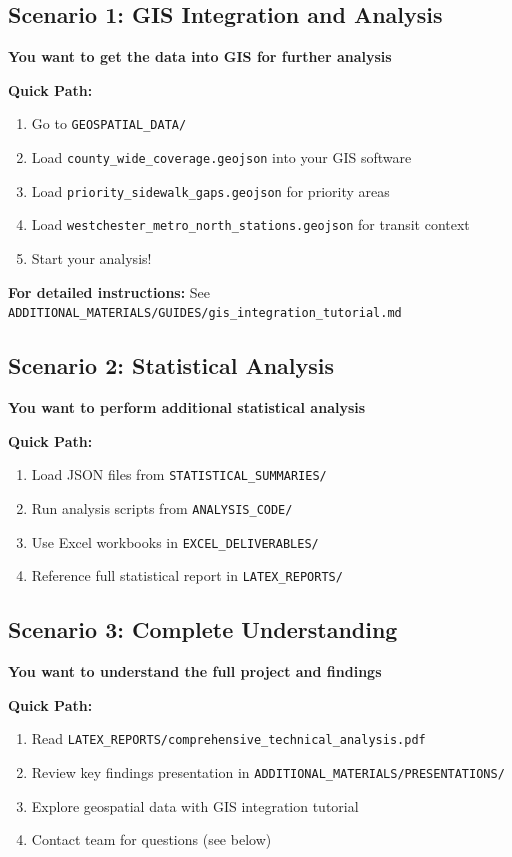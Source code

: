 \documentclass[11pt,letterpaper]{article}
\begin{document}
\subsection{Scenario 1: GIS Integration and Analysis}
\textbf{You want to get the data into GIS for further analysis}

\textbf{Quick Path:}
\begin{enumerate}
    \item Go to \texttt{GEOSPATIAL\_DATA/}
    \item Load \texttt{county\_wide\_coverage.geojson} into your GIS software
    \item Load \texttt{priority\_sidewalk\_gaps.geojson} for priority areas
    \item Load \texttt{westchester\_metro\_north\_stations.geojson} for transit context
    \item Start your analysis!
\end{enumerate}

\textbf{For detailed instructions:} See \texttt{ADDITIONAL\_MATERIALS/GUIDES/gis\_integration\_tutorial.md}

\subsection{Scenario 2: Statistical Analysis}
\textbf{You want to perform additional statistical analysis}

\textbf{Quick Path:}
\begin{enumerate}
    \item Load JSON files from \texttt{STATISTICAL\_SUMMARIES/}
    \item Run analysis scripts from \texttt{ANALYSIS\_CODE/}
    \item Use Excel workbooks in \texttt{EXCEL\_DELIVERABLES/}
    \item Reference full statistical report in \texttt{LATEX\_REPORTS/}
\end{enumerate}

\subsection{Scenario 3: Complete Understanding}
\textbf{You want to understand the full project and findings}

\textbf{Quick Path:}
\begin{enumerate}
    \item Read \texttt{LATEX\_REPORTS/comprehensive\_technical\_analysis.pdf}
    \item Review key findings presentation in \texttt{ADDITIONAL\_MATERIALS/PRESENTATIONS/}
    \item Explore geospatial data with GIS integration tutorial
    \item Contact team for questions (see below)
\end{enumerate}
\end{document}
